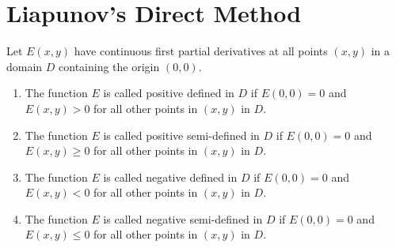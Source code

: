 \documentclass[../main-sheet.tex]{subfiles}
\begin{document}
\chapter{Liapunov's Direct Method}
\begin{defn}
    Let \(E(x,y)\) have continuous first partial derivatives at all points \((x,y)\) in a domain \(D\) containing the origin \((0,0)\).
    \begin{enumerate}
        \item The function \(E\) is called positive defined in \(D\) if \(E(0,0)=0\) and \(E(x,y)>0\) for all other points in \((x,y)\) in \(D\).
        \item The function \(E\) is called positive semi-defined in \(D\) if \(E(0,0)=0\) and \(E(x,y)\geq 0\) for all other points in \((x,y)\) in \(D\).
        \item The function \(E\) is called negative defined in \(D\) if \(E(0,0)=0\) and \(E(x,y)< 0\) for all other points in \((x,y)\) in \(D\).
        \item The function \(E\) is called negative semi-defined in \(D\) if \(E(0,0)=0\) and \(E(x,y)\leq 0\) for all other points in \((x,y)\) in \(D\).
    \end{enumerate}
\end{defn}
\end{document}
